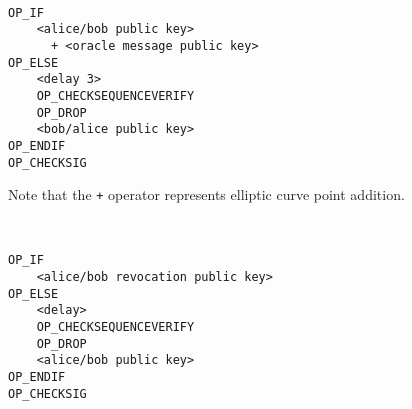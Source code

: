 \begin{script}\label{script:cet}\\
\begin{Verbatim}[samepage=true]
OP_IF
    <alice/bob public key>
      + <oracle message public key>
OP_ELSE
    <delay 3>
    OP_CHECKSEQUENCEVERIFY
    OP_DROP
    <bob/alice public key>
OP_ENDIF
OP_CHECKSIG
\end{Verbatim}
Note that the \Verb _+_ operator represents elliptic curve point addition.
\end{script}

\begin{script}~\label{script:splittx}\\
\begin{Verbatim}[samepage=true]
OP_IF
    <alice/bob revocation public key>
OP_ELSE
    <delay>
    OP_CHECKSEQUENCEVERIFY
    OP_DROP
    <alice/bob public key>
OP_ENDIF
OP_CHECKSIG
\end{Verbatim}
\end{script}